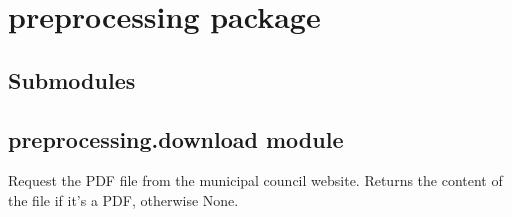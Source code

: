 \documentclass[letterpaper,10pt,english]{sphinxmanual}
\begin{document}
\chapter{preprocessing package}
\label{\detokenize{preprocessing:preprocessing-package}}\label{\detokenize{preprocessing::doc}}

\section{Submodules}
\label{\detokenize{preprocessing:submodules}}

\section{preprocessing.download module}
\label{\detokenize{preprocessing:module-preprocessing.download}}\label{\detokenize{preprocessing:preprocessing-download-module}}

\begin{fulllineitems}
\label{\detokenize{preprocessing:preprocessing.download.download_pdf}}
\pysigstartsignatures
\pysiglinewithargsret
{}
{\sphinxparamcomma {}}
{}
\pysigstopsignatures
\end{fulllineitems}


\begin{fulllineitems}
\label{\detokenize{preprocessing:preprocessing.download.request_pdf}}
\pysigstartsignatures
\pysiglinewithargsret
{}
{\sphinxparamcomma {}}
{}
\pysigstopsignatures
\sphinxAtStartPar
Request the PDF file from the municipal council website.
Returns the content of the file if it’s a PDF, otherwise None.

\end{fulllineitems}
\end{document}
